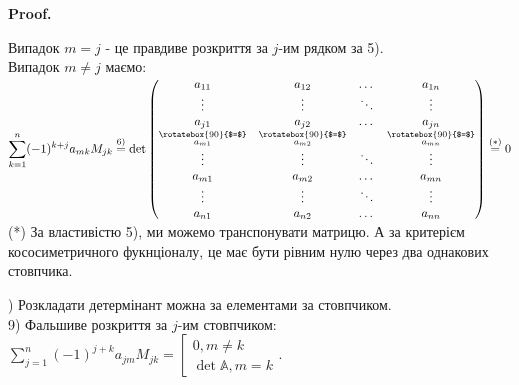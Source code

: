 \documentclass[a4paper, 10pt]{article}
\makeatletter
\theoremstyle{theoremdd}
\renewenvironment{proof}[1][Proof.\\]{\par
\pushQED{\hfill \qed}%
\normalfont \topsep6\p@\@plus6\p@\relax
\trivlist
\item\relax
{\bfseries
#1\@addpunct{.}}\hspace\labelsep\ignorespaces
}{%
\popQED\endtrivlist\@endpefalse
}
\makeatother
\begin{document}
\begin{proof}
Випадок $m = j$ - це \textquotedbl правдиве\textquotedbl{} розкриття за $j$-им рядком за 5).\\
Випадок $m \neq j$ маємо:\\
$\displaystyle \sum_{k=1}^n (-1)^{k+j} a_{mk} M_{jk} \overset{\textrm{6)}}{=} \det \begin{pmatrix}
a_{11} & a_{12} & \dots & a_{1n} \\
\vdots & \vdots & \ddots & \vdots \\
\underset{\substack{\rotatebox{90}{$=$} \\ a_{m1}}}{a_{j1}} & \underset{\substack{\rotatebox{90}{$=$} \\ a_{m2}}}{a_{j2}} & \dots & \underset{\substack{\rotatebox{90}{$=$} \\ a_{mn}}}{a_{jn}} \\
\vdots & \vdots & \ddots & \vdots \\
a_{m1} & a_{m2} & \dots & a_{mn} \\
\vdots & \vdots & \ddots & \vdots \\
a_{n1} & a_{n2} & \dots & a_{nn}
\end{pmatrix} \overset{(*)}{=} 0$\\
(*) За властивістю 5), ми можемо транспонувати матрицю. А за критерієм кососиметричного фукнціоналу, це має бути рівним нулю через два однакових стовпчика.
\end{proof}

) Розкладати детермінант можна за елементами за стовпчиком.\\
9) \textquotedbl Фальшиве\textquotedbl{} розкриття за $j$-им стовпчиком: $\displaystyle \sum_{j=1}^n (-1)^{j+k} a_{jm}M_{jk} = \left[\begin{gathered} 0, m \neq k \\ \det \mathbb{A}, m = k \end{gathered} \right.$.
\end{document}
